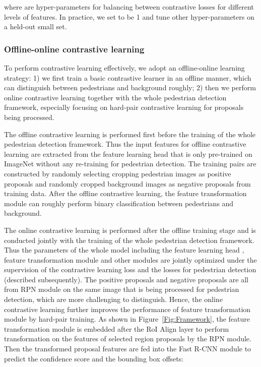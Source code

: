 \documentclass[journal]{IEEEtran}
\begin{document}
where  are hyper-parameters for balancing between contrastive losses for different levels of features. In practice, we set  to be 1 and tune other hyper-parameters on a held-out small set.



\subsubsection{Offline-online contrastive learning}
To perform contrastive learning effectively, we adopt an offline-online learning strategy: 1) we first train a basic contrastive learner in an offline manner, which can distinguish between pedestrians and background roughly; 2) then we perform online contrastive learning together with the whole pedestrian detection framework, especially focusing on hard-pair contrastive learning for proposals being processed. 

The offline contrastive learning is performed first before the training of the whole pedestrian detection framework. Thus the input features for offline contrastive learning are extracted from the feature learning head  that is only pre-trained on ImageNet without any re-training for pedestrian detection. The training pairs are constructed by randomly selecting cropping pedestrian images as positive proposals and randomly cropped background images as negative proposals from training data. After the offline contrastive learning, the feature transformation module  can roughly perform binary classification between pedestrians and background.

The online contrastive learning is performed after the offline training stage and is conducted jointly with the training of the whole pedestrian detection framework. Thus the parameters of the whole model including the feature learning head , feature transformation module  and other modules are jointly optimized under the supervision of the contrastive learning loss and the losses for pedestrian detection (described subsequently). The positive proposals and negative proposals are all from RPN module on the same image that is being processed for pedestrian detection, which are more challenging to distinguish. Hence, the online contrastive learning further improves the performance of feature transformation module by hard-pair training.
As shown in Figure~\ref{Fig:Framework}, the feature transformation module  is embedded after the RoI Align layer to perform transformation on the features of selected region proposals by the RPN module. Then the transformed proposal features are fed into the Fast R-CNN module to predict the confidence score and the bounding box offsets:
\end{document}
